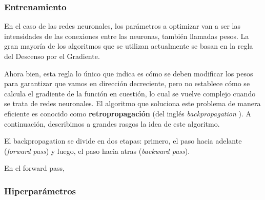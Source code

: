 \documentclass[../../main.tex]{subfiles}
\begin{document}

\subsubsection{Entrenamiento}
En el caso de las redes neuronales, los parámetros a optimizar van a ser las intensidades
de las conexiones entre las neuronas, también llamadas pesos. La gran mayoría de los
algoritmos que se utilizan actualmente se basan en la regla del Descenso por el Gradiente.

Ahora bien, esta regla lo único que indica es cómo se deben modificar los pesos para
garantizar que vamos en dirección decreciente, pero no establece cómo se calcula el
gradiente de la función en cuestión, lo cual se vuelve complejo cuando se trata de redes
neuronales. El algoritmo que soluciona este problema de manera eficiente es conocido como
\textbf{retropropagación} (del inglés \textit{backpropagation} \cite{backprop-1986}). A
continuación, describimos a grandes rasgos la idea de este algoritmo.

El backpropagation se divide en dos etapas: primero, el paso hacia adelante (\textit{forward pass})
y luego, el paso hacia atras (\textit{backward pass}).

En el forward pass,


\subsubsection{Hiperparámetros}
\end{document}
